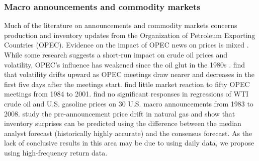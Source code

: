 \subsubsection{Macro announcements and commodity markets}

Much of the literature on announcements and commodity markets concerns production and inventory updates from the Organization of  Petroleum Exporting Countries (OPEC). Evidence on the impact of OPEC news on prices is mixed \citep{10.5089/9798400219788.001, 10.1016/j.enpol.2009.10.053}. While some research suggests a short-run impact on crude oil prices and volatility, OPEC's influence has weakened since the oil glut in the 1980s \citep{10.1111/j.1477-8947.1983.tb00276.x}.
\citet*{horan2004implied} find that volatility drifts upward as OPEC meetings draw nearer and decreases in the first five days after the meetings start. \citet*{wirl2004impact} find little market reaction to fifty OPEC meetings from 1984 to 2001.   \citet*{kilian2011energy} find no significant responses in regressions of WTI crude oil and U.S. gasoline prices on 30 U.S. macro announcements from 1983 to 2008.   \citet*{gu2018drives} study the pre-announcement price drift in natural gas and show that inventory surprises can be predicted using the difference between the median analyst forecast (historically highly accurate) and the consensus forecast. 
As the lack of conclusive results in this area may be due to using daily data, we propose using high-frequency return data.


